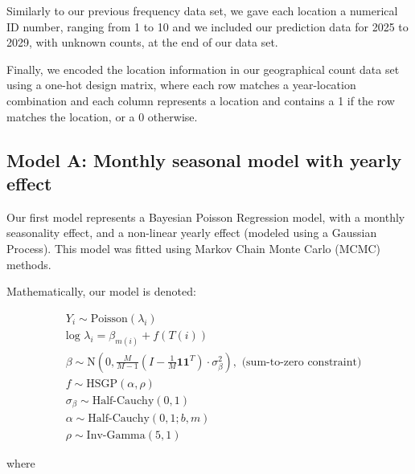 \documentclass[
]{article}
\begin{document}
Similarly to our previous frequency data set, we gave each location a numerical ID number, ranging from 1 to 10 and we included our prediction data for 2025 to 2029, with unknown counts, at the end of our data set.

Finally, we encoded the location information in our geographical count data set using a one-hot design matrix, where each row matches a year-location combination and each column represents a location and contains a 1 if the row matches the location, or a 0 otherwise.

\subsection{Model A: Monthly seasonal model with yearly effect}\label{model-a-monthly-seasonal-model-with-yearly-effect}

Our first model represents a Bayesian Poisson Regression model, with a monthly seasonality effect, and a non-linear yearly effect (modeled using a Gaussian Process). This model was fitted using Markov Chain Monte Carlo (MCMC) methods.

Mathematically, our model is denoted:

\begin{align*}
&Y_{i} \sim \text{Poisson}(\lambda_{i})\\
&\text{log } \lambda_{i} =  \beta_{m(i)} + f(T(i))\\
&\beta \sim \text{N}( 0, \frac{M}{M-1}( I - \frac{1}{M} \mathbf{1}\mathbf{1}^T) \cdot \sigma_{\beta}^2), \text{  (sum-to-zero constraint)}\\
& f \sim \text{HSGP}(\alpha, \rho)\\
&\sigma_{\beta} \sim \text{Half-Cauchy}(0,1)\\
&\alpha \sim \text{Half-Cauchy}(0,1; b, m) \\
&\rho \sim \text{Inv-Gamma}(5,1)
\end{align*}

where
\end{document}
